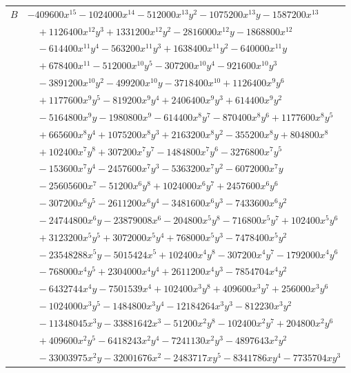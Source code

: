 \documentclass[11pt]{article}
\begin{document}
\begin{longtable}{@{}ll@{}}
$B$ & $-409600x^{15}-1024000x^{14}-512000x^{13}y^{2}-1075200x^{13}y-1587200x^{13}$\\
 & $\quad +1126400x^{12}y^{3}+1331200x^{12}y^{2}-2816000x^{12}y-1868800x^{12}$\\
 & $\quad -614400x^{11}y^{4}-563200x^{11}y^{3}+1638400x^{11}y^{2}-640000x^{11}y$\\
 & $\quad +678400x^{11}-512000x^{10}y^{5}-307200x^{10}y^{4}-921600x^{10}y^{3}$\\
 & $\quad -3891200x^{10}y^{2}-499200x^{10}y-3718400x^{10}+1126400x^{9}y^{6}$\\
 & $\quad +1177600x^{9}y^{5}-819200x^{9}y^{4}+2406400x^{9}y^{3}+614400x^{9}y^{2}$\\
 & $\quad -5164800x^{9}y-1980800x^{9}-614400x^{8}y^{7}-870400x^{8}y^{6}+1177600x^{8}y^{5}$\\
 & $\quad +665600x^{8}y^{4}+1075200x^{8}y^{3}+2163200x^{8}y^{2}-355200x^{8}y+804800x^{8}$\\
 & $\quad +102400x^{7}y^{8}+307200x^{7}y^{7}-1484800x^{7}y^{6}-3276800x^{7}y^{5}$\\
 & $\quad -153600x^{7}y^{4}-2457600x^{7}y^{3}-5363200x^{7}y^{2}-6072000x^{7}y$\\
 & $\quad -25605600x^{7}-51200x^{6}y^{8}+1024000x^{6}y^{7}+2457600x^{6}y^{6}$\\
 & $\quad -307200x^{6}y^{5}-2611200x^{6}y^{4}-3481600x^{6}y^{3}-7433600x^{6}y^{2}$\\
 & $\quad -24744800x^{6}y-23879008x^{6}-204800x^{5}y^{8}-716800x^{5}y^{7}+102400x^{5}y^{6}$\\
 & $\quad +3123200x^{5}y^{5}+3072000x^{5}y^{4}+768000x^{5}y^{3}-7478400x^{5}y^{2}$\\
 & $\quad -23548288x^{5}y-5015424x^{5}+102400x^{4}y^{8}-307200x^{4}y^{7}-1792000x^{4}y^{6}$\\
 & $\quad -768000x^{4}y^{5}+2304000x^{4}y^{4}+2611200x^{4}y^{3}-7854704x^{4}y^{2}$\\
 & $\quad -6432744x^{4}y-7501539x^{4}+102400x^{3}y^{8}+409600x^{3}y^{7}+256000x^{3}y^{6}$\\
 & $\quad -1024000x^{3}y^{5}-1484800x^{3}y^{4}-12184264x^{3}y^{3}-812230x^{3}y^{2}$\\
 & $\quad -11348045x^{3}y-33881642x^{3}-51200x^{2}y^{8}-102400x^{2}y^{7}+204800x^{2}y^{6}$\\
 & $\quad +409600x^{2}y^{5}-6418243x^{2}y^{4}-7241130x^{2}y^{3}-4897643x^{2}y^{2}$\\
 & $\quad -33003975x^{2}y-32001676x^{2}-2483717xy^{5}-8341786xy^{4}-7735704xy^{3}$\\

\end{longtable}
\end{document}
